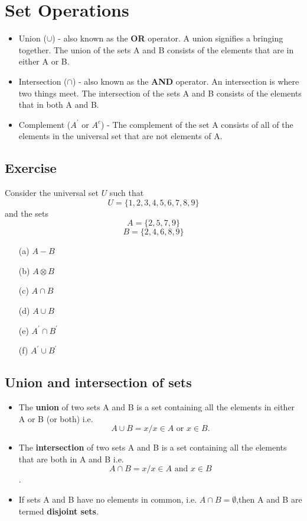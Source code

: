 \section*{Set Operations}
\begin{itemize}
	\item Union ($\cup$) - also known as the \textbf{OR} operator. A union signifies a bringing together. The union of the sets A and B consists of the elements that are in either A or B.
	\item Intersection ($\cap$) - also known as the \textbf{AND} operator. An intersection is where two things meet. The intersection of the sets A and B consists of the elements that in both A and B.
	\item Complement ($A^{\prime}$ or $A^{c}$) - The complement of the set A consists of all of the elements in the universal set that are not elements of A.
\end{itemize}

\subsection*{Exercise}
Consider the universal set $U$ such that
\[U=\{1,2,3,4,5,6,7,8,9\} \] 
and the sets
\[A=\{2,5,7,9\} \] 
\[B=\{2,4,6,8,9\} \]

\begin{multicols}{2}
\begin{itemize}
	\item[(a)] $A-B$
	\item[(b)] $A \otimes B$
	\item[(c)] $A \cap B$
	\item[(d)] $A \cup B$
	\item[(e)] $A^{\prime} \cap B^{\prime}$
	\item[(f)] $A^{\prime} \cup B^{\prime}$
\end{itemize}
\end{multicols}

\newpage
\subsection*{Union and intersection of sets}

\begin{itemize}
\item The \textbf{union} of two sets A and B is a set containing all the elements in
either A or B (or both)
i.e. 
\[A \cup B = {x / x \in A \mbox{ or } x \in B}.\]
\item The \textbf{intersection} of two sets A and B is a set containing all the elements
that are both in A and B
i.e. 
\[A \cap B = {x / x \in A \mbox{ and }x \in B}\].

\item If sets A and B have no elements in common, i.e. $A \cap B = \emptyset$,then A and B
are termed \textbf{disjoint sets}.
\end{itemize}
\newpage

